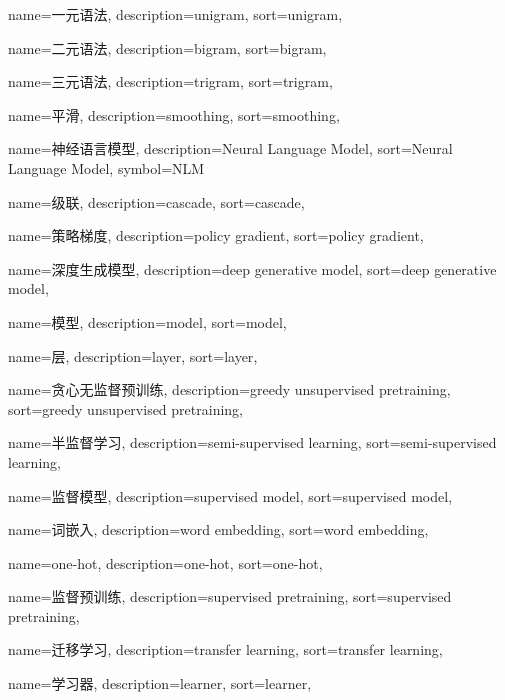 {
  name=一元语法,
  description={unigram},
  sort={unigram},
}

{
  name=二元语法,
  description={bigram},
  sort={bigram},
}

{
  name=三元语法,
  description={trigram},
  sort={trigram},
}

{
  name=平滑,
  description={smoothing},
  sort={smoothing},
}

{
  name=神经语言模型,
  description={Neural Language Model},
  sort={Neural Language Model},
  symbol={NLM}
}

{
  name=级联,
  description={cascade},
  sort={cascade},
}

{
  name=策略梯度,
  description={policy gradient},
  sort={policy gradient},
}

{
  name=深度生成模型,
  description={deep generative model},
  sort={deep generative model},
}

{
  name=模型,
  description={model},
  sort={model},
}

{
  name=层,
  description={layer},
  sort={layer},
}

{
  name=贪心无监督预训练,
  description={greedy unsupervised pretraining},
  sort={greedy unsupervised pretraining},
}

{
  name=半监督学习,
  description={semi-supervised learning},
  sort={semi-supervised learning},
}

{
  name=监督模型,
  description={supervised model},
  sort={supervised model},
}

{
  name=词嵌入,
  description={word embedding},
  sort={word embedding},
}

{
  name=one-hot,
  description={one-hot},
  sort={one-hot},
}

{
  name=监督预训练,
  description={supervised pretraining},
  sort={supervised pretraining},
}

{
  name=迁移学习,
  description={transfer learning},
  sort={transfer learning},
}

{
  name=学习器,
  description={learner},
  sort={learner},
}

